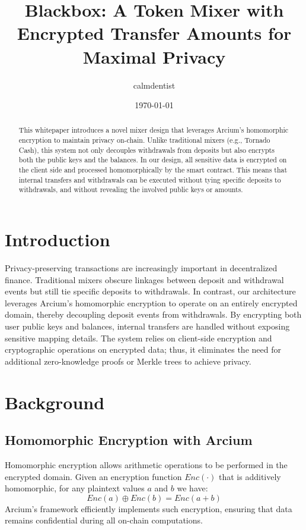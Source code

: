 \documentclass[11pt]{article}
\title{Blackbox: A Token Mixer with Encrypted Transfer Amounts for Maximal Privacy}
\author{calmdentist}
\date{\today}
\begin{document}
\maketitle

\begin{abstract}
This whitepaper introduces a novel mixer design that leverages Arcium's homomorphic encryption to maintain privacy on-chain. Unlike traditional mixers (e.g., Tornado Cash), this system not only decouples withdrawals from deposits but also encrypts both the public keys and the balances. In our design, all sensitive data is encrypted on the client side and processed homomorphically by the smart contract. This means that internal transfers and withdrawals can be executed without tying specific deposits to withdrawals, and without revealing the involved public keys or amounts.
\end{abstract}

\section{Introduction}
Privacy-preserving transactions are increasingly important in decentralized finance. Traditional mixers obscure linkages between deposit and withdrawal events but still tie specific deposits to withdrawals. In contrast, our architecture leverages Arcium's homomorphic encryption to operate on an entirely encrypted domain, thereby decoupling deposit events from withdrawals. By encrypting both user public keys and balances, internal transfers are handled without exposing sensitive mapping details. The system relies on client-side encryption and cryptographic operations on encrypted data; thus, it eliminates the need for additional zero-knowledge proofs or Merkle trees to achieve privacy.

\section{Background}
\subsection{Homomorphic Encryption with Arcium}
Homomorphic encryption allows arithmetic operations to be performed in the encrypted domain. Given an encryption function \( Enc(\cdot) \) that is additively homomorphic, for any plaintext values \( a \) and \( b \) we have:
\[
Enc(a) \oplus Enc(b) = Enc(a+b)
\]
Arcium's framework efficiently implements such encryption, ensuring that data remains confidential during all on-chain computations.
\end{document}
